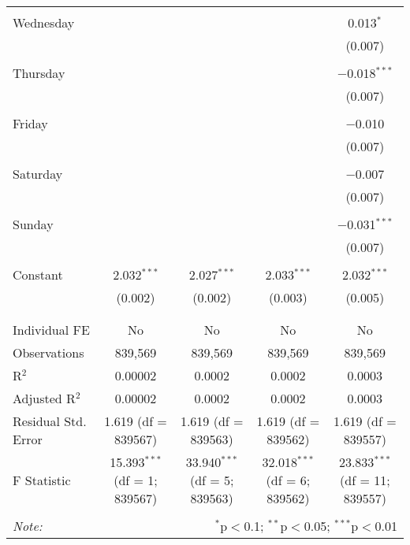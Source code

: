 \documentclass[
]{article}
\begin{document}
\begin{table}[!htbp]
{\begin{tabular}{@{\extracolsep{5pt}}lcccc}
  & & & & \\ 
 Wednesday &  &  &  & 0.013$^{*}$ \\ 
  &  &  &  & (0.007) \\ 
  & & & & \\ 
 Thursday &  &  &  & $-$0.018$^{***}$ \\ 
  &  &  &  & (0.007) \\ 
  & & & & \\ 
 Friday &  &  &  & $-$0.010 \\ 
  &  &  &  & (0.007) \\ 
  & & & & \\ 
 Saturday &  &  &  & $-$0.007 \\ 
  &  &  &  & (0.007) \\ 
  & & & & \\ 
 Sunday &  &  &  & $-$0.031$^{***}$ \\ 
  &  &  &  & (0.007) \\ 
  & & & & \\ 
 Constant & 2.032$^{***}$ & 2.027$^{***}$ & 2.033$^{***}$ & 2.032$^{***}$ \\ 
  & (0.002) & (0.002) & (0.003) & (0.005) \\ 
  & & & & \\ 
\hline \\[-1.8ex] 
Individual FE & No & No & No & No \\ 
Observations & 839,569 & 839,569 & 839,569 & 839,569 \\ 
R$^{2}$ & 0.00002 & 0.0002 & 0.0002 & 0.0003 \\ 
Adjusted R$^{2}$ & 0.00002 & 0.0002 & 0.0002 & 0.0003 \\ 
Residual Std. Error & 1.619 (df = 839567) & 1.619 (df = 839563) & 1.619 (df = 839562) & 1.619 (df = 839557) \\ 
F Statistic & 15.393$^{***}$ (df = 1; 839567) & 33.940$^{***}$ (df = 5; 839563) & 32.018$^{***}$ (df = 6; 839562) & 23.833$^{***}$ (df = 11; 839557) \\ 
\hline 
\hline \\[-1.8ex] 
\textit{Note:}  & \multicolumn{4}{r}{$^{*}$p$<$0.1; $^{**}$p$<$0.05; $^{***}$p$<$0.01} \\ 
\end{tabular}
} 
\end{table} 
\newpage
\end{document}
